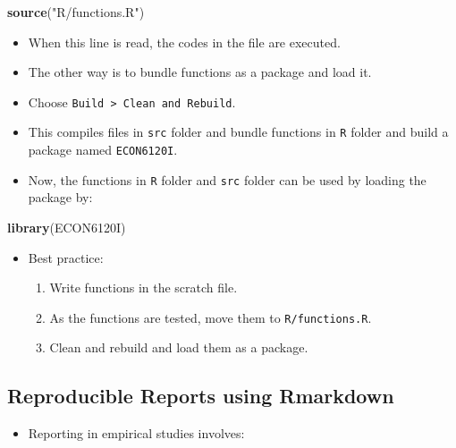\documentclass[]{book}
\newenvironment{Shaded}{\begin{snugshade}}{\end{snugshade}}
\newcommand{\KeywordTok}[1]{\textcolor[rgb]{0.13,0.29,0.53}{\textbf{#1}}}
\newcommand{\StringTok}[1]{\textcolor[rgb]{0.31,0.60,0.02}{#1}}
\newcommand{\NormalTok}[1]{#1}
\providecommand{\tightlist}{%
  \setlength{\itemsep}{0pt}\setlength{\parskip}{0pt}}
\theoremstyle{definition}
\theoremstyle{definition}
\theoremstyle{definition}
\theoremstyle{remark}
\begin{document}
\begin{Shaded}
\begin{Highlighting}[]
\KeywordTok{source}\NormalTok{(}\StringTok{"R/functions.R"}\NormalTok{)}
\end{Highlighting}
\end{Shaded}

\begin{itemize}
\tightlist
\item
  When this line is read, the codes in the file are executed.
\item
  The other way is to bundle functions as a package and load it.
\item
  Choose \texttt{Build\ \textgreater{}\ Clean\ and\ Rebuild}.
\item
  This compiles files in \texttt{src} folder and bundle functions in
  \texttt{R} folder and build a package named \texttt{ECON6120I}.
\item
  Now, the functions in \texttt{R} folder and \texttt{src} folder can be
  used by loading the package by:
\end{itemize}

\begin{Shaded}
\begin{Highlighting}[]
\KeywordTok{library}\NormalTok{(ECON6120I)}
\end{Highlighting}
\end{Shaded}

\begin{itemize}
\tightlist
\item
  Best practice:

  \begin{enumerate}
  \def\labelenumi{\arabic{enumi}.}
  \tightlist
  \item
    Write functions in the scratch file.
  \item
    As the functions are tested, move them to \texttt{R/functions.R}.
  \item
    Clean and rebuild and load them as a package.
  \end{enumerate}
\end{itemize}

\subsection{Reproducible Reports using
Rmarkdown}\label{reproducible-reports-using-rmarkdown}

\begin{itemize}
\tightlist
\item
  Reporting in empirical studies involves:
\end{itemize}
\end{document}
